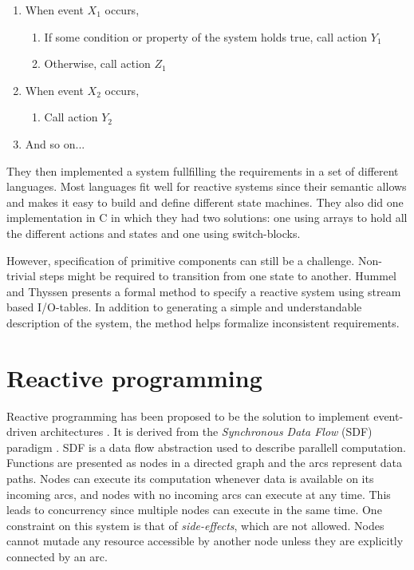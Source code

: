 \begin{enumerate}
\item
  When event $X_1$ occurs,
\begin{enumerate}
\item
  If some condition or property of the system holds true, call action $Y_1$
\item
  Otherwise, call action $Z_1$
\end{enumerate}

\item
  When event $X_2$ occurs,
\begin{enumerate}
\item
  Call action $Y_2$
\end{enumerate}

\item
  And so on...
\end{enumerate}

They then implemented a system fullfilling the requirements in a set of
different languages. Most languages fit well for reactive systems since their
semantic allows and makes it easy to build and define different state machines.
They also did one implementation in C in which they had two solutions: one
using arrays to hold all the different actions and states and one using
switch-blocks.

However, specification of primitive components can still be a challenge.
Non-trivial steps might be required to transition from one state to another.
Hummel and Thyssen \cite{hummel2009behavioral} presents a formal method to
specify a reactive system using stream based I/O-tables. In addition to
generating a simple and understandable description of the system, the method
helps formalize inconsistent requirements.

\section{Reactive programming}

Reactive programming has been proposed to be the solution to implement
event-driven architectures \cite{bainomugisha2013survey}. It is derived from
the \textit{Synchronous Data Flow} (SDF) paradigm \cite{lee1987synchronous}.
SDF is a data flow abstraction used to describe parallell computation.
Functions are presented as nodes in a directed graph and the arcs represent
data paths. Nodes can execute its computation whenever data is available on its
incoming arcs, and nodes with no incoming arcs can execute at any time. This
leads to concurrency since multiple nodes can execute in the same time. One
constraint on this system is that of \textit{side-effects}, which are not
allowed. Nodes cannot mutade any resource accessible by another node unless
they are explicitly connected by an arc.

